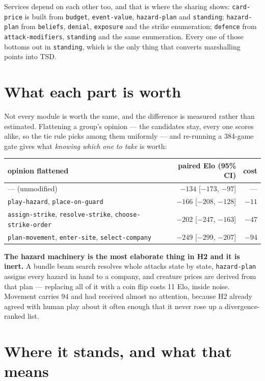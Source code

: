 \documentclass[11pt,a4paper]{article}
\begin{document}
Services depend on each other too, and that is where the sharing shows:
\texttt{card-price} is built from \texttt{budget}, \texttt{event-value},
\texttt{hazard-plan} and \texttt{standing}; \texttt{hazard-plan} from
\texttt{beliefs}, \texttt{denial}, \texttt{exposure} and the strike
enumeration; \texttt{defence} from \texttt{attack-modifiers},
\texttt{standing} and the same enumeration. Every one of those bottoms out in
\texttt{standing}, which is the only thing that converts marshalling points
into TSD.

\section*{What each part is worth}

Not every module is worth the same, and the difference is measured rather than
estimated. Flattening a group's opinion --- the candidates stay,
every one scores alike, so the tie rule picks among them uniformly --- and
re-running a 384-game gate gives what \emph{knowing which one to take} is worth:

\begin{center}
\begin{tabular}{lrr}
\toprule
opinion flattened & paired Elo (95\% CI) & cost \\
\midrule
--- (unmodified) & $-134$ [$-173$, $-97$] & --- \\
\texttt{play-hazard}, \texttt{place-on-guard} & $-166$ [$-208$, $-128$] & $-11$ \\
\texttt{assign-strike}, \texttt{resolve-strike}, \texttt{choose-strike-order} & $-202$ [$-247$, $-163$] & $-47$ \\
\texttt{plan-movement}, \texttt{enter-site}, \texttt{select-company} & $-249$ [$-299$, $-207$] & $-94$ \\
\bottomrule
\end{tabular}
\end{center}

\textbf{The hazard machinery is the most elaborate thing in H2 and it is inert.}
A bundle beam search resolves whole attacks state by state, \texttt{hazard-plan}
assigns every hazard in hand to a company, and creature prices are derived from
that plan --- replacing all of it with a coin flip costs 11 Elo, inside noise.
Movement carries 94 and had received almost no attention, because H2 already
agreed with human play about it often enough that it never rose up a
divergence-ranked list.

\section*{Where it stands, and what that means}
\end{document}
